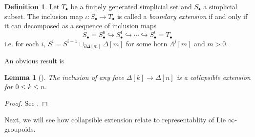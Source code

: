 \documentclass[12pt]{amsart}
\newtheorem{lem}[thm]{Lemma}
\theoremstyle{definition}
\newtheorem{defn}[thm]{Definition}
\theoremstyle{remark}
\numberwithin{equation}{section}
\newcommand{\del}{\partial}
\renewcommand{\del}{\partial}
\newcommand{\1}{{\mathbb{1}}}
\newcommand{\bt}{\bullet}
\begin{document}
\begin{defn}
    Let $T_{\bt}$ be a finitely generated simplicial set and $S_{\bt}$ a simplicial subset.  The inclusion map $\iota: S_{\bt} \to T_{\bt}$ is called a {\it boundary extension} if and only if it can decomposed as a sequence of inclusion  maps
    \begin{equation*}
        S_{\bullet} = S^0_{\bt} \hookrightarrow
        S^1_{\bt} \hookrightarrow \cdots \hookrightarrow S^l_{\bt} = T_{\bt}
    \end{equation*}
    i.e. for each $i$, $S^i = S^{i-1}\sqcup_{\del \Delta[m]} \Delta[m]$ for some horn $\Lambda^j[m]$ and $m>0$. 
\end{defn}

An obvious result is
\begin{lem}[]
    The inclusion of any face $\Delta[k] \to \Delta[n]$ is a collapsible extension for $0 \le k \le n$.
\end{lem}
\begin{proof}
    See \cite[Lemma2.44]{Li15}.
\end{proof}
Next, we will see how collapsible extension relate to representablity of Lie $\infty$-groupoids.
\end{document}
